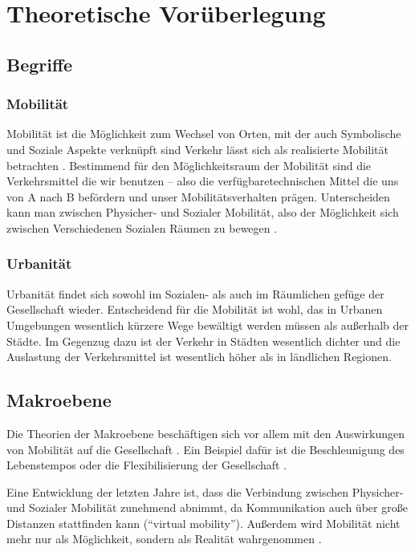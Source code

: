 
\section{Theoretische Vorüberlegung}

\subsection{Begriffe}
\subsubsection*{Mobilität}

Mobilität ist die Möglichkeit zum Wechsel von Orten, mit der auch Symbolische und Soziale Aspekte verknüpft sind Verkehr lässt sich als realisierte Mobilität betrachten \parencite[6]{fh7}.
Bestimmend für den Möglichkeitsraum der Mobilität sind die Verkehrsmittel die wir benutzen – also die verfügbaretechnischen Mittel die uns von A nach B befördern und unser Mobilitätsverhalten prägen.
Unterscheiden kann man zwischen Physicher- und Sozialer Mobilität, also der Möglichkeit sich zwischen Verschiedenen Sozialen Räumen zu bewegen \parencite[67 f.]{schulz}.

\subsubsection*{Urbanität}
Urbanität findet sich sowohl im Sozialen- als auch im Räumlichen gefüge der Gesellschaft wieder.
Entscheidend für die Mobilität ist wohl, das in Urbanen Umgebungen wesentlich kürzere Wege bewältigt werden müssen als außerhalb der Städte.
Im Gegenzug dazu ist der Verkehr in Städten wesentlich dichter und die Auslastung der Verkehrsmittel ist wesentlich höher als in ländlichen Regionen.

\subsection{Makroebene}
Die Theorien der Makroebene beschäftigen sich vor allem mit den Auswirkungen von Mobilität auf die Gesellschaft \parencite[6 ff.]{widmer}.
Ein Beispiel dafür ist die Beschleunigung des Lebenstempos \parencite{rosa,rosa1} oder die Flexibilisierung der Gesellschaft \parencite{sennett}.

Eine Entwicklung der letzten Jahre ist, dass die Verbindung zwischen Physicher- und Sozialer Mobilität zunehmend abnimmt, da Kommunikation auch über große Distanzen stattfinden kann (\enquote{virtual mobility}).
Außerdem wird Mobilität nicht mehr nur als Möglichkeit, sondern als Realität wahrgenommen \parencite[17 f.]{widmer}.

